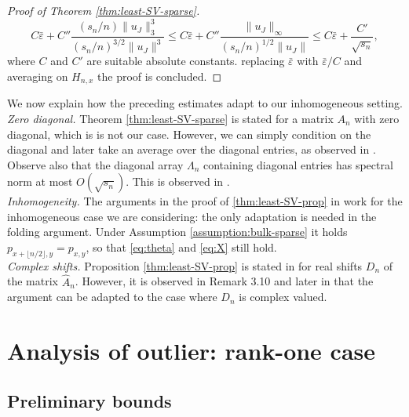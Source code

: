 \documentclass[11pt,oneside]{amsart}
\theoremstyle{plain}
\numberwithin{equation}{section}
\newcommand{\eps}{\varepsilon}
\newcommand{\scaling}{s_n}
\begin{document}
\begin{proof}[Proof of Theorem \ref{thm:least-SV-sparse}]
\begin{equation}
    C\bar \eps + C'' \frac{({\scaling}/{n}) \|u_J\|^3_3}{({\scaling}/{n})^{3/2} \|u_J\|^3} \le   C\bar \eps + C'' \frac{\|u_J\|_\infty}{({\scaling}/{n})^{1/2} \|u_J\|} \le C\bar\eps + \frac{C'}{\sqrt{\scaling}},
\end{equation}
where $C$ and $C'$ are suitable absolute constants. replacing $\bar \eps$ with $\bar \eps/C$ and averaging on $H_{n,x}$ the proof is concluded.    
\end{proof}
We now explain how the preceding estimates adapt to our inhomogeneous setting.\\


{\it Zero diagonal.} 
    Theorem \ref{thm:least-SV-sparse} is stated for a matrix $ A_n $ with zero diagonal, which is is not our case. 
    However, we can simply condition on the diagonal and later take an average over the diagonal entries, as observed in \cite[p.\ 7]{BasakRudelson19-arxiv}.
    Observe also that the diagonal array $\Lambda_n$ containing diagonal entries has spectral norm at most $O(\sqrt{\scaling})$. This is observed in \cite[p. 472]{BasakRudelson-invertibility}.\\



{\it Inhomogeneity.}
    The arguments in the proof of \ref{thm:least-SV-prop} in \cite{BasakRudelson-invertibility} work for the inhomogeneous case we are considering: {the only} adaptation is needed in the folding argument. Under Assumption \ref{assumption:bulk-sparse} it holds $p_{x+\lfloor n/2\rfloor,y}=p_{x,y}$, so that \eqref{eq:theta} and \eqref{eq:X} still hold.\\
    

{\it Complex shifts.}
    Proposition \ref{thm:least-SV-prop} is stated in \cite{BasakRudelson-invertibility} for real shifts $D_n$ of the matrix $\hat A_n$. However, it is observed in Remark 3.10 and later in \cite[Proposition 3.4]{BasakRudelson19} that the argument can be adapted to the case where $D_n$ is complex valued.

\section{Analysis of outlier: rank-one case}
\label{sec:sp-outlier-1}

\subsection{Preliminary bounds}
\end{document}
